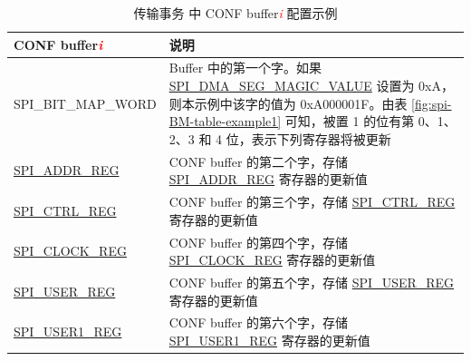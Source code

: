 \documentclass[main\_\_CN.tex]{subfiles}
\begin{document}
\begin{longtable}[c]{|L{3.5cm}|p{10cm}| }
\caption{传输事务  中 CONF buffer\textcolor{red}{\it i} 配置示例}
\label{fig:spi-BM-table-example2}\\\hline
{}
     \textbf{CONF buffer\textcolor{red}{\it i}} & \textbf{说明} \\\hline
     SPI\_BIT\_MAP\_WORD & Buffer 中的第一个字。如果 \hyperref[fielddesc:SPIDMASEGMAGICVALUE]{SPI\_DMA\_SEG\_MAGIC\_VALUE} 设置为 0xA，则本示例中该字的值为 0xA000001F。由表 \ref{fig:spi-BM-table-example1} 可知，被置 1 的位有第 0、1、2、3 和 4 位，表示下列寄存器将被更新 \\\hline
     
 \hyperref[regdesc:SPIADDRREG]{SPI\_ADDR\_REG} & CONF buffer 的第二个字，存储 \hyperref[regdesc:SPIADDRREG]{SPI\_ADDR\_REG} 寄存器的更新值       
     \\\hline
 \hyperref[regdesc:SPICTRLREG]{SPI\_CTRL\_REG} & CONF buffer 的第三个字，存储 \hyperref[regdesc:SPICTRLREG]{SPI\_CTRL\_REG} 寄存器的更新值      
     \\\hline
 \hyperref[regdesc:SPICLOCKREG]{SPI\_CLOCK\_REG} & CONF buffer 的第四个字，存储 \hyperref[regdesc:SPICLOCKREG]{SPI\_CLOCK\_REG} 寄存器的更新值     
     \\\hline
 \hyperref[regdesc:SPIUSERREG]{SPI\_USER\_REG} & CONF buffer 的第五个字，存储 \hyperref[regdesc:SPIUSERREG]{SPI\_USER\_REG} 寄存器的更新值 
     \\\hline
 \hyperref[regdesc:SPIUSER1REG]{SPI\_USER1\_REG} & CONF buffer 的第六个字，存储 \hyperref[regdesc:SPIUSER1REG]{SPI\_USER1\_REG} 寄存器的更新值
     \\\hline
\end{longtable} 
\end{document}
